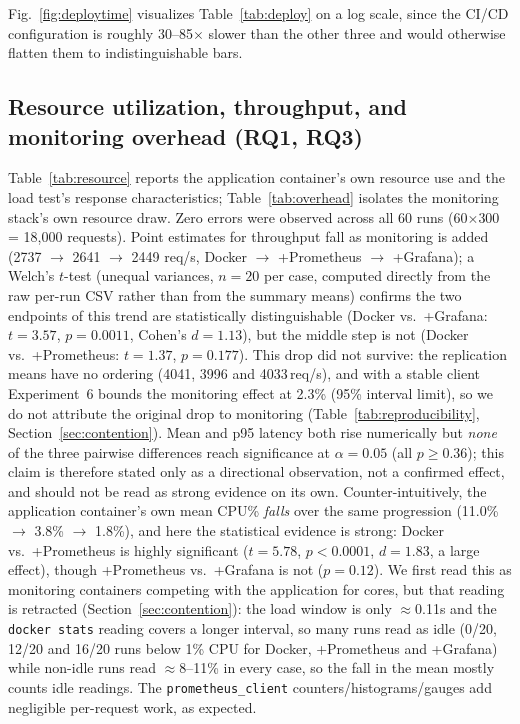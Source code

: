 \documentclass[conference]{IEEEtran}
\begin{document}
Fig.~\ref{fig:deploytime} visualizes Table~\ref{tab:deploy} on a log scale,
since the CI/CD configuration is roughly 30--85$\times$ slower than
the other three and would otherwise flatten them to indistinguishable bars.

\subsection{Resource utilization, throughput, and monitoring overhead (RQ1, RQ3)}
Table~\ref{tab:resource} reports the application container's own resource use
and the load test's response characteristics; Table~\ref{tab:overhead}
isolates the monitoring stack's own resource draw. Zero errors were observed
across all 60 runs (60$\times$300 = 18{,}000 requests). Point estimates for
throughput fall as monitoring is added (2737 $\to$ 2641 $\to$ 2449 req/s,
Docker $\to$ +Prometheus $\to$ +Grafana); a Welch's $t$-test (unequal
variances, $n{=}20$ per case, computed directly from the raw per-run CSV
rather than from the summary means) confirms the two endpoints of this
trend are statistically distinguishable (Docker vs.\ +Grafana:
$t{=}3.57$, $p{=}0.0011$, Cohen's $d{=}1.13$), but the middle step is not
(Docker vs.\ +Prometheus: $t{=}1.37$, $p{=}0.177$). This drop did not
survive: the replication means have no ordering (4041, 3996 and 4033\,req/s), and with
a stable client Experiment~6 bounds the monitoring effect at 2.3\% (95\% interval limit), so we do not
attribute the original drop to monitoring (Table~\ref{tab:reproducibility},
Section~\ref{sec:contention}). Mean and p95 latency both rise numerically but \emph{none} of the
three pairwise differences reach significance at $\alpha{=}0.05$ (all
$p \geq 0.36$); this claim is therefore stated only as a directional
observation, not a confirmed effect, and should not be read as strong
evidence on its own.
Counter-intuitively, the application container's own mean CPU\% \emph{falls}
over the same progression (11.0\% $\to$ 3.8\% $\to$ 1.8\%), and here the
statistical evidence is strong: Docker vs.\ +Prometheus is highly
significant ($t{=}5.78$, $p{<}0.0001$, $d{=}1.83$, a large effect), though
+Prometheus vs.\ +Grafana is not ($p{=}0.12$). We first read this as monitoring
containers competing with the application for cores, but that reading is
retracted (Section~\ref{sec:contention}): the load window is only
$\approx$0.11s and the \texttt{docker stats} reading covers a longer interval,
so many runs read as idle (0/20, 12/20 and 16/20 runs below 1\% CPU for Docker,
+Prometheus and +Grafana) while non-idle runs read $\approx$8--11\% in every
case, so the fall in the mean mostly counts idle readings. The
\texttt{prometheus\_client} counters/histograms/gauges add negligible
per-request work, as expected.
\end{document}
